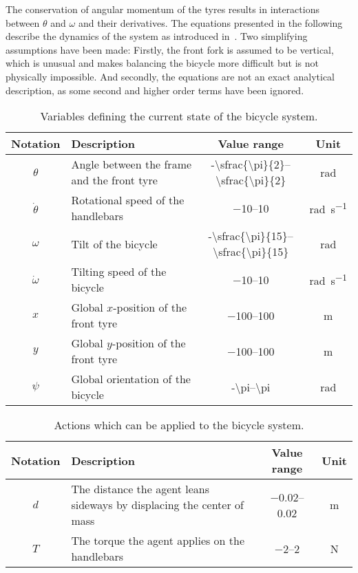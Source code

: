 The conservation of angular momentum of the tyres results in interactions between $\theta$ and $\omega$ and their derivatives.
The equations presented in the following describe the dynamics of the system as introduced in~\cite{randlov_learning_1998}.
Two simplifying assumptions have been made:
Firstly, the front fork is assumed to be vertical, which is unusual and makes balancing the bicycle more difficult but is not physically impossible.
And secondly, the equations are not an exact analytical description, as some second and higher order terms have been ignored.
\begin{table}[p]
    \centering
    \caption{Variables defining the current state of the bicycle system.}
    \label{tab:bicycle_variables}
    \begin{tabularx}{\tablewidth}{cXcc}
        \toprule
        Notation & Description & Value range & Unit \\
        \midrule
        $\theta$ & Angle between the frame and the front tyre & \numrange[parse-numbers=false]{-\sfrac{\pi}{2}}{\sfrac{\pi}{2}} & \si{\radian} \\
        $\dot{\theta}$ & Rotational speed of the handlebars & \numrange{-10}{10} & \si{\radian\per\second} \\
        $\omega$ & Tilt of the bicycle & \numrange[parse-numbers=false]{-\sfrac{\pi}{15}}{\sfrac{\pi}{15}} & \si{\radian} \\
        $\dot{\omega}$ & Tilting speed of the bicycle & \numrange{-10}{10} & \si{\radian\per\second} \\
        $x$ & Global $x$-position of the front tyre & \numrange{-100}{100} & \si{\metre} \\
        $y$ & Global $y$-position of the front tyre & \numrange{-100}{100} & \si{\metre} \\
        $\psi$ & Global orientation of the bicycle & \numrange[parse-numbers=false]{-\pi}{\pi} & \si{\radian} \\
        \bottomrule
    \end{tabularx}
\end{table}
\begin{table}[p]
    \centering
    \caption{Actions which can be applied to the bicycle system.}
    \label{tab:bicycle_actions}
    \begin{tabularx}{\tablewidth}{cXcc}
        \toprule
        Notation & Description & Value range & Unit \\
        \midrule
        $d$ & The distance the agent leans sideways by displacing the center of mass & \numrange{-0.02}{0.02} & \si{\metre} \\
        $T$ & The torque the agent applies on the handlebars & \numrange{-2}{2} & \si{\N} \\
        \bottomrule
    \end{tabularx}
\end{table}
